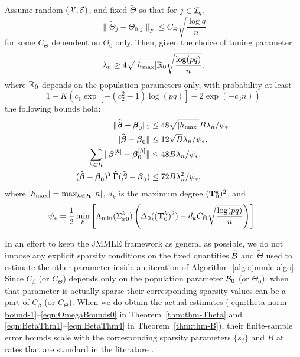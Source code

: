 \begin{theorem}\label{thm:thm-B}
Assume random $({\cal{X}}, {\cal{E}})$, and fixed $\widetilde \Theta$ so that for $j \in {\cal{I}}_q$,
%
\[
\| \widetilde \Theta_j - \Theta_{0,j} \|_F \leq C_\Theta \sqrt{\frac{\log q}{n}}
\]
%
for some $C_\Theta$ dependent on $\Theta_0$ only. Then, given the choice of tuning parameter
%
$$
\lambda_n \geq 4 \sqrt{| h_{\max} |} {\mathbb{R}}_0 \sqrt{ \frac{ \log(pq)}{n}},
$$
%
where ${\mathbb{R}}_0$ depends on the population parameters only, with probability at least
%
$$ 1 - K( c_1 \exp[-(c_2^2-1) \log(pq)] - 2 \exp( -c_3 n)) $$
%
the following bounds hold:
%
\begin{align}
\| \widehat {{\boldsymbol{\beta}}} - {\boldsymbol{\beta}}_0 \|_1 & \leq 48 \sqrt{ | h_{\max} |} B \lambda_n / \psi_*, \label{eqn:BetaThm1}\\
\| \widehat {{\boldsymbol{\beta}}} - {\boldsymbol{\beta}}_0 \| & \leq 12 \sqrt B \lambda_n / \psi_*, \label{eqn:BetaThm2}\\
\sum_{h \in {\cal{H}}} \| {\boldsymbol{\beta}}^{[h]} - {\boldsymbol{\beta}}_0^{[h]} \| & \leq 48 B \lambda_n / \psi_*, \label{eqn:BetaThm3}\\
(\widehat {{\boldsymbol{\beta}}} - {\boldsymbol{\beta}}_0 )^T \widehat {{\boldsymbol{\Gamma}}} (\widehat {{\boldsymbol{\beta}}} - {\boldsymbol{\beta}}_0 ) & \leq
72 B \lambda_n^2 / \psi_*, \label{eqn:BetaThm4}
\end{align}
%
where $|h_{\max}| = \max_{h \in {\cal{H}}} |h|$, $d_k$ is the maximum degree $({\mathbf{T}}_0^k)^2$, and
%
$$
\psi_*= \frac{1}{2} \min_k \left[ \Lambda_{\min} (\Sigma_{x 0}^k) \left( \Delta_0 ( ({\mathbf{T}}_0^k)^2)
- d_k C_\Theta \sqrt{ \frac{\log (pq)}{n}} \right) \right].
$$
%
\end{theorem}

{\colb
\begin{Remark}
In an effort to keep the JMMLE framework as general as possible, we do not impose any explicit sparsity conditions on the fixed quantities $\widetilde {{\cal{B}}}$ and $\widetilde \Theta$ used to estimate the other parameter inside an iteration of Algorithm~\ref{algo:jmmle-algo}. Since $C_\beta$ (or $C_\Theta$) depends only on the population parameter ${\cal{B}}_0$ (or $\Theta_0$), when that parameter is actually sparse their corresponding sparsity values can be a part of $C_\beta$ (or $C_\Theta$). When we do obtain the actual estimates (\eqref{eqn:theta-norm-bound-1}--\eqref{eqn:OmegaBounds0} in Theorem~\ref{thm:thm-Theta} and \eqref{eqn:BetaThm1}--\eqref{eqn:BetaThm4} in Theorem~\ref{thm:thm-B}), their finite-sample error bounds scale with the corresponding sparsity parameters $\{s_j\}$ and $B$ at rates that are standard in the literature \citep{BasuMichailidis15,LohWainwright12,RavikumarEtal11}.
\end{Remark}
}

